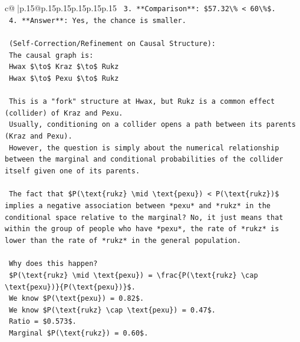 \documentclass{article}
\begin{document}
{\begin{supertabular}{c@{$\;$}|p{.15\linewidth}@{}p{.15\linewidth}p{.15\linewidth}p{.15\linewidth}p{.15\linewidth}p{.15\linewidth}}
{{{\texttt{    3.  **Comparison**: \$57.32\textbackslash{}\% < 60\textbackslash{}\%\$.} \\
\texttt{    4.  **Answer**: Yes, the chance is smaller.} \\
\\ 
\texttt{    (Self{-}Correction/Refinement on Causal Structure):} \\
\texttt{    The causal graph is:} \\
\texttt{    Hwax \$\textbackslash{}to\$ Kraz \$\textbackslash{}to\$ Rukz} \\
\texttt{    Hwax \$\textbackslash{}to\$ Pexu \$\textbackslash{}to\$ Rukz} \\
\\ 
\texttt{    This is a "fork" structure at Hwax, but Rukz is a common effect (collider) of Kraz and Pexu.} \\
\texttt{    Usually, conditioning on a collider opens a path between its parents (Kraz and Pexu).} \\
\texttt{    However, the question is simply about the numerical relationship between the marginal and conditional probabilities of the collider itself given one of its parents.} \\
\\ 
\texttt{    The fact that \$P(\textbackslash{}text\{rukz\} \textbackslash{}mid \textbackslash{}text\{pexu\}) < P(\textbackslash{}text\{rukz\})\$ implies a negative association between *pexu* and *rukz* in the conditional space relative to the marginal? No, it just means that within the group of people who have *pexu*, the rate of *rukz* is lower than the rate of *rukz* in the general population.} \\
\\ 
\texttt{    Why does this happen?} \\
\texttt{    \$P(\textbackslash{}text\{rukz\} \textbackslash{}mid \textbackslash{}text\{pexu\}) = \textbackslash{}frac\{P(\textbackslash{}text\{rukz\} \textbackslash{}cap \textbackslash{}text\{pexu\})\}\{P(\textbackslash{}text\{pexu\})\}\$.} \\
\texttt{    We know \$P(\textbackslash{}text\{pexu\}) = 0.82\$.} \\
\texttt{    We know \$P(\textbackslash{}text\{rukz\} \textbackslash{}cap \textbackslash{}text\{pexu\}) = 0.47\$.} \\
\texttt{    Ratio = \$0.573\$.} \\
\texttt{    Marginal \$P(\textbackslash{}text\{rukz\}) = 0.60\$.} \\
\\ 
}}}
\end{supertabular}}
\end{document}
